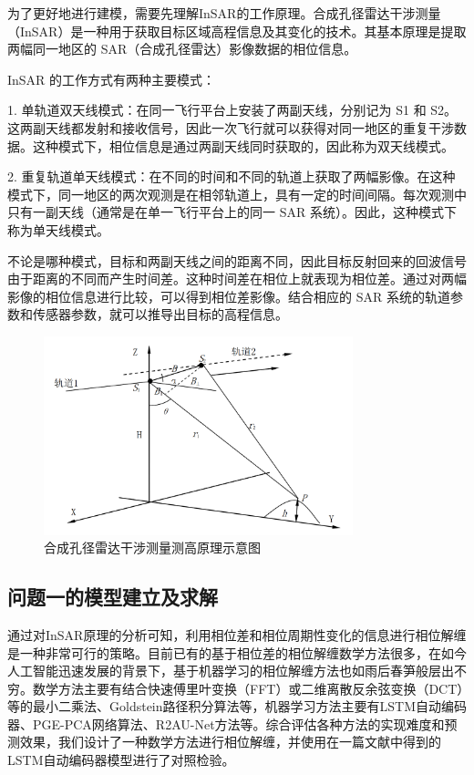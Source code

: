 \documentclass[a4paper]{article}
\begin{document}
	为了更好地进行建模，需要先理解InSAR的工作原理。合成孔径雷达干涉测量（InSAR）是一种用于获取目标区域高程信息及其变化的技术。其基本原理是提取两幅同一地区的 SAR（合成孔径雷达）影像数据的相位信息。\par
	InSAR 的工作方式有两种主要模式：\par
	1. 单轨道双天线模式：在同一飞行平台上安装了两副天线，分别记为 S1 和 S2。这两副天线都发射和接收信号，因此一次飞行就可以获得对同一地区的重复干涉数据。这种模式下，相位信息是通过两副天线同时获取的，因此称为双天线模式。\par
	2. 重复轨道单天线模式：在不同的时间和不同的轨道上获取了两幅影像。在这种模式下，同一地区的两次观测是在相邻轨道上，具有一定的时间间隔。每次观测中只有一副天线（通常是在单一飞行平台上的同一 SAR 系统）。因此，这种模式下称为单天线模式。\par
	不论是哪种模式，目标和两副天线之间的距离不同，因此目标反射回来的回波信号由于距离的不同而产生时间差。这种时间差在相位上就表现为相位差。通过对两幅影像的相位信息进行比较，可以得到相位差影像。结合相应的 SAR 系统的轨道参数和传感器参数，就可以推导出目标的高程信息。
	
	\begin{figure}[H] %
		\centering %
		\includegraphics[width=0.8\textwidth]{insar_priciple.png} %
		\caption{合成孔径雷达干涉测量测高原理示意图}
		\label{fig:insar_principle} %
	\end{figure}
	
	\subsection{问题一的模型建立及求解}

	通过对InSAR原理的分析可知，利用相位差和相位周期性变化的信息进行相位解缠是一种非常可行的策略。目前已有的基于相位差的相位解缠数学方法很多，在如今人工智能迅速发展的背景下，基于机器学习的相位解缠方法也如雨后春笋般层出不穷。数学方法主要有结合快速傅里叶变换（FFT）或二维离散反余弦变换（DCT）等的最小二乘法、Goldstein路径积分算法等，机器学习方法主要有LSTM自动编码器、PGE-PCA网络算法、R2AU-Net方法等。综合评估各种方法的实现难度和预测效果，我们设计了一种数学方法进行相位解缠，并使用在一篇文献中得到的LSTM自动编码器模型进行了对照检验。
\end{document}
